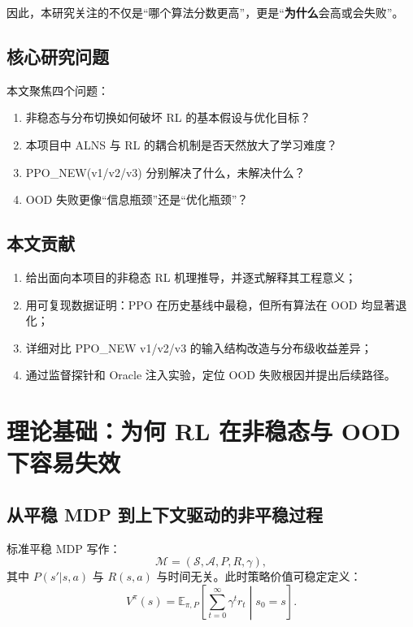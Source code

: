 ﻿\documentclass[11pt,a4paper]{ctexart}
\begin{document}
因此，本研究关注的不仅是“哪个算法分数更高”，更是“\textbf{为什么}会高或会失败”。

\subsection{核心研究问题}
本文聚焦四个问题：
\begin{enumerate}[label=Q\arabic*.,leftmargin=*]
  \item 非稳态与分布切换如何破坏 RL 的基本假设与优化目标？
  \item 本项目中 ALNS 与 RL 的耦合机制是否天然放大了学习难度？
  \item PPO\_NEW(v1/v2/v3) 分别解决了什么，未解决什么？
  \item OOD 失败更像“信息瓶颈”还是“优化瓶颈”？
\end{enumerate}

\subsection{本文贡献}
\begin{enumerate}[leftmargin=*]
  \item 给出面向本项目的非稳态 RL 机理推导，并逐式解释其工程意义；
  \item 用可复现数据证明：PPO 在历史基线中最稳，但所有算法在 OOD 均显著退化；
  \item 详细对比 PPO\_NEW v1/v2/v3 的输入结构改造与分布级收益差异；
  \item 通过监督探针和 Oracle 注入实验，定位 OOD 失败根因并提出后续路径。
\end{enumerate}

\section{理论基础：为何 RL 在非稳态与 OOD 下容易失效}
\subsection{从平稳 MDP 到上下文驱动的非平稳过程}
标准平稳 MDP 写作：
\begin{equation}
\mathcal{M}=(\mathcal{S},\mathcal{A},P,R,\gamma),
\end{equation}
其中 $P(s'|s,a)$ 与 $R(s,a)$ 与时间无关。此时策略价值可稳定定义：
\begin{equation}
V^{\pi}(s)=\mathbb{E}_{\pi,P}\left[\sum_{t=0}^{\infty}\gamma^t r_t\middle|s_0=s\right].
\end{equation}
\end{document}

